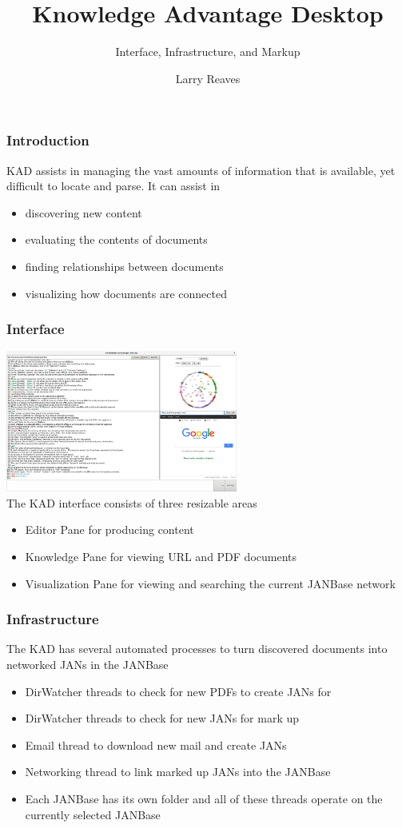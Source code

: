 \documentclass{beamer}
\begin{document}
  \title{Knowledge Advantage Desktop}
  \subtitle{Interface, Infrastructure, and Markup}
  \author{Larry Reaves}
  \frame{\titlepage}
  \begin{frame}
    \frametitle{Introduction}
    KAD assists in managing the vast amounts of information that is available, yet difficult to locate and parse.
    It can assist in\\
    \begin{itemize}
    \item{discovering new content}
    \item{evaluating the contents of documents}
    \item{finding relationships between documents}
    \item{visualizing how documents are connected}
    \end{itemize}
  \end{frame}
  \begin{frame}
    \frametitle{Interface}
    \includegraphics[width=3in]{images/kad-overview.png}\\
    The KAD interface consists of three resizable areas\\
    \begin{itemize}
    \item{Editor Pane for producing content}
    \item{Knowledge Pane for viewing URL and PDF documents}
    \item{Visualization Pane for viewing and searching the current JANBase network}
    \end{itemize}
  \end{frame}
  \begin{frame}
    \frametitle{Infrastructure}
    The KAD has several automated processes to turn discovered documents into networked JANs in the JANBase\\
    \begin{itemize}
    \item{DirWatcher threads to check for new PDFs to create JANs for}
    \item{DirWatcher threads to check for new JANs for mark up}
    \item{Email thread to download new mail and create JANs}
    \item{Networking thread to link marked up JANs into the JANBase}
    \item{Each JANBase has its own folder and all of these threads operate on the currently selected JANBase}
    \end{itemize}
  \end{frame}
\end{document}

